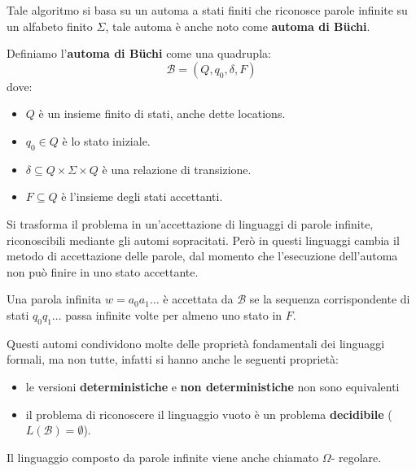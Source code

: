 Tale algoritmo si basa su un automa a stati finiti che riconosce parole infinite
su un alfabeto finito $\Sigma$, tale automa è anche noto come \textbf{automa di
Büchi}.

\begin{definizione}
    Definiamo l'\textbf{automa di Büchi} come una quadrupla:
    \begin{equation}
        \mathcal{B} = (Q, q_0, \delta, F)
    \end{equation}
    dove:
    \begin{itemize}
        \item $Q$ è un insieme finito di stati, anche dette locations.
        \item $q_0 \in Q$ è lo stato iniziale.
        \item $\delta \subseteq Q \times \Sigma \times Q$ è una relazione di
              transizione.
        \item $F \subseteq Q$ è l'insieme degli stati accettanti.
    \end{itemize}
\end{definizione}

Si trasforma il problema in un'accettazione di linguaggi di parole infinite, 
riconoscibili mediante gli automi sopracitati. Però in questi linguaggi cambia il
metodo di accettazione delle parole, dal momento che l'esecuzione dell'automa non 
può finire in uno stato accettante.

\begin{definizione}
    Una parola infinita $w = a_0a_1\dots$ è accettata da $\mathcal{B}$ se la
    sequenza corrispondente di stati $q_0q_1\dots$ passa infinite volte per
    almeno uno stato in $F$.
\end{definizione}

Questi automi condividono molte delle proprietà fondamentali dei linguaggi formali, 
ma non tutte, infatti si hanno anche le seguenti proprietà:
\begin{itemize}
    \item le versioni \textbf{deterministiche} e \textbf{non deterministiche} 
    non sono equivalenti
    \item il problema di riconoscere il linguaggio vuoto è un problema \textbf{decidibile} ($L(\mathcal{B}) = \emptyset$).
\end{itemize}

\begin{nota}
    Il linguaggio composto da parole infinite viene anche chiamato $\Omega$-
    regolare.
\end{nota}

